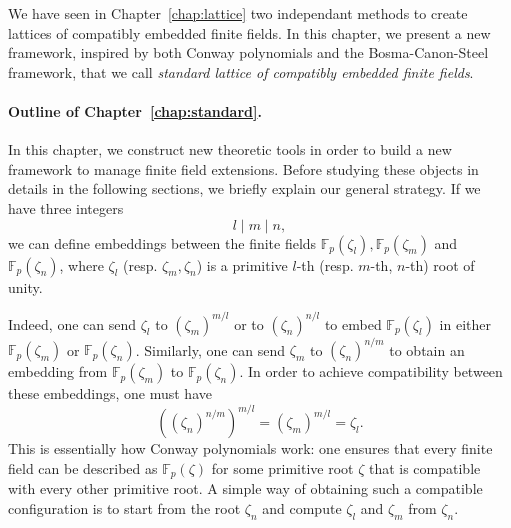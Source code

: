 We have seen in Chapter~\ref{chap:lattice} two independant methods to create
lattices of compatibly embedded finite fields. In this chapter, we present a new
framework, inspired by both Conway polynomials and the Bosma-Canon-Steel
framework, that we call \emph{standard lattice of compatibly embedded finite
fields}.
\minitoc


\clearpage

\paragraph{Outline of Chapter~\ref{chap:standard}.} In this chapter, we
construct new theoretic tools in order to build a new framework to manage finite
field extensions. Before studying these objects in details in the following
sections, we briefly explain our general strategy. If we have three integers
\[
  l\mid m\mid n,
\]
we can define embeddings between the finite fields
$\mathbb{F}_{p}(\zeta_l), \mathbb{F}_{p}(\zeta_m)$ and
$\mathbb{F}_{p}(\zeta_n)$, where $\zeta_l$ (resp. $\zeta_m, \zeta_n$) is a
primitive $l$-th (resp. $m$-th, $n$-th) root of unity.
\begin{center}
\end{center}
Indeed, one can send $\zeta_l$ to $(\zeta_m)^{m/l}$ or to $(\zeta_n)^{n/l}$ to
embed $\mathbb{F}_p(\zeta_l)$ in either $\mathbb{F}_{p}(\zeta_m)$ or
$\mathbb{F}_p(\zeta_n)$. Similarly, one can send $\zeta_m$ to
$(\zeta_n)^{n/m}$ to obtain an embedding from $\mathbb{F}_{p}(\zeta_m)$ to
$\mathbb{F}_p(\zeta_n)$. In order to achieve compatibility between these
embeddings, one must have
\[
  ((\zeta_n)^{n/m})^{m/l} = (\zeta_m)^{m/l} = \zeta_l.
\]
This is essentially how Conway polynomials work: one
ensures that every finite field can be described as $\mathbb{F}_{p}(\zeta)$ for
some primitive root $\zeta$ that is compatible with every other primitive root.
A simple way of obtaining such a compatible configuration is to start from the root
$\zeta_n$ and compute $\zeta_l$ and $\zeta_m$ from $\zeta_n$.

